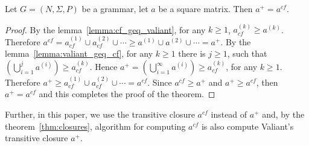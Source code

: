 \begin{mytheorem}\label{thm:closures}
	Let $G =(N,\Sigma,P)$ be a grammar, let $a$ be a square matrix. Then $a^+ = a^{cf}$.
\end{mytheorem}
\begin{proof}
	
	By the lemma~\ref{lemma:cf_geq_valiant}, for any $k \geq 1$, $a^{(k)}_{cf} \geq a^{(k)}$. Therefore $a^{cf} = a^{(1)}_{cf} \cup a^{(2)}_{cf} \cup \cdots \geq a^{(1)} \cup a^{(2)} \cup \cdots = a^+$. By the lemma~\ref{lemma:valiant_geq_cf}, for any $k \geq 1$ there is $j \geq 1$, such that $(\bigcup^{j}_{i=1}{a^{(i)}}) \geq a^{(k)}_{cf}$. Hence $a^+ = (\bigcup^{\infty}_{i=1}{a^{(i)}}) \geq a^{(k)}_{cf}$, for any $k \geq 1$. Therefore $a^+ \geq a^{(1)}_{cf} \cup a^{(2)}_{cf} \cup \cdots = a^{cf}$. Since $a^{cf} \geq a^+$ and $a^+ \geq a^{cf}$, then $a^+ = a^{cf}$ and this completes the proof of the theorem.
\end{proof}

Further, in this paper, we use the transitive closure $a^{cf}$ instead of $a^+$ and, by the theorem~\ref{thm:closures}, algorithm for computing $a^{cf}$ is also compute Valiant's transitive closure $a^+$.